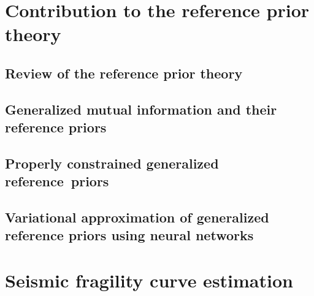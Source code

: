 \documentclass[a4paper]{book}
\begin{document}
\dominitoc
\setcounter{tocdepth}{1}
\tableofcontents
\newpage

\pagestyle{fancy}\thispagestyle{plain}





\part{Contribution to the reference prior theory}\label{part:ref-theory}

\chapter{Review of the reference prior theory}\label{chap:intro-ref}




\chapter{Generalized mutual information and their reference priors}\label{chap:ref-generalized}




\chapter{Properly constrained generalized reference~priors}\label{chap:constrained-prior}




\chapter{Variational approximation of generalized reference priors using neural networks}\label{chap:varp}




\part{Seismic fragility curve estimation}\label{part:spra}
\end{document}
